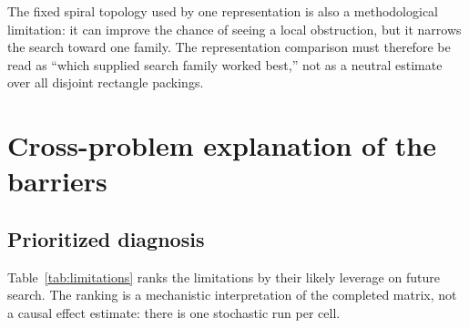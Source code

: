 \documentclass[11pt]{article}
\begin{document}
The fixed spiral topology used by one representation is also a methodological
limitation: it can improve the chance of seeing a local obstruction, but it
narrows the search toward one family.  The representation comparison must
therefore be read as ``which supplied search family worked best,'' not as a
neutral estimate over all disjoint rectangle packings.

\clearpage
\section{Cross-problem explanation of the barriers}

\subsection{Prioritized diagnosis}

Table~\ref{tab:limitations} ranks the limitations by their likely leverage on
future search.  The ranking is a mechanistic interpretation of the completed
matrix, not a causal effect estimate: there is one stochastic run per cell.
\end{document}

